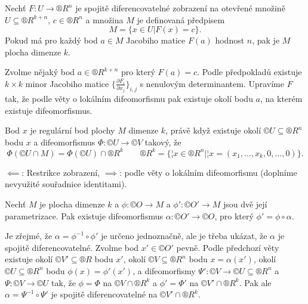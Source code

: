 \documentclass[12pt]{article}                   %
\begin{document}
        \begin{veta}
            Nechť $F: U \rightarrow ®R^n$ je spojitě diferencovatelné zobrazení na otevřené množině $U \subseteq ®R^{k + n}$, $c \in ®R^n$ a množina $M$ je definovaná předpisem
            $$ M = \{x \in U | F(x) = c\}. $$
            Pokud má pro každý bod $a \in M$ Jacobiho matice $F(a)$ hodnost $n$, pak je $M$ plocha dimenze $k$.

            \begin{dukazin}
                Zvolme nějaký bod $a \in ®R^{k+n}$ pro který $F(a) = c$. Podle předpokladů existuje $k \times k$ minor Jacobiho matice $\{\frac{\partial F_i}{\partial x_j}\}_{i,j}$ s nenulovým determinantem. Upravíme $F$ tak, že podle věty o lokálním difeomorfismu pak existuje okolí bodu $a$, na kterém existuje difeomorfismus.
            \end{dukazin}
        \end{veta}

        \begin{veta}
            Bod $x$ je regulární bod plochy $M$ dimenze $k$, právě když existuje okolí $©U \subseteq ®R^n$ bodu $x$ a difeomorfismus $\Phi: ©U \rightarrow ©V$ takový, že
            $$ \Phi(©U \cap M) = \Phi(©U) \cap ®R^k \qquad ®R^k = \{¦x \in ®R^n | ¦x = (x_1, …, x_k, 0, …, 0)\}. $$

            \begin{dukazin}
                $\impliedby$: Restrikce zobrazení, $\implies$: podle věty o lokálním difeomorfismu (doplníme nevyužité souřadnice identitami).
            \end{dukazin}
        \end{veta}

        \begin{lemma}
            Nechť $M$ je plocha dimenze $k$ a $\phi: ©O \rightarrow M$ a $\phi': ©O' \rightarrow M$ jsou dvě její parametrizace. Pak existuje difeomorfismus $\alpha: ©O' \rightarrow ©O$, pro který $\phi' = \phi \circ \alpha$.

            \begin{dukazin}
                Je zřejmé, že $\alpha = \phi^{-1} \circ \phi'$ je určeno jednoznačně, ale je třeba ukázat, že $\alpha$ je spojitě diferencovatelné. Zvolme bod $x' \in ©O'$ pevně. Podle předchozí věty existuje okolí $©V' \subseteq ®R$ bodu $x'$, okolí $©V \subseteq ®R^n$ bodu $x = \alpha(x')$, okolí $©U \subseteq ®R^n$ bodu $\phi(x) = \phi'(x')$, a difeomorfismy $\Psi': ©V \rightarrow ©U \subseteq ®R^n$ a $\Psi: ©V \rightarrow ©U$ tak, že $\phi = \Phi$ na $©V \cap ®R^k$ a $\phi' = \Phi'$ na $©V' \cap ®R^k$. Pak ale $\alpha = \Psi^{-1} \circ \Psi'$ je spojitě diferencovatelné na $©V' \cap ®R^k$.
            \end{dukazin}
        \end{lemma}
\end{document}
